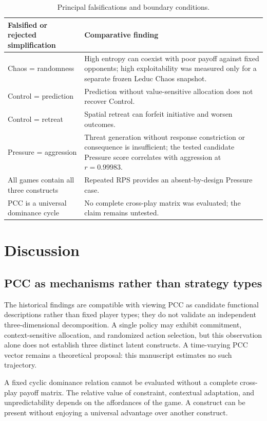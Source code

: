 \documentclass[journal]{IEEEtran}
\begin{document}
\begin{table}[t]
\caption{Principal falsifications and boundary conditions.}
\label{tab:falsifications}
\centering
\begin{tabular}{L{5.5cm}L{9.5cm}}
\toprule
\textbf{Falsified or rejected simplification} & \textbf{Comparative finding} \\
\midrule
Chaos = randomness & High entropy can coexist with poor payoff against fixed opponents; high exploitability was measured only for a separate frozen Leduc Chaos snapshot. \\
Control = prediction & Prediction without value-sensitive allocation does not recover Control. \\
Control = retreat & Spatial retreat can forfeit initiative and worsen outcomes. \\
Pressure = aggression & Threat generation without response constriction or consequence is insufficient; the tested candidate Pressure score correlates with aggression at $r=0.99983$. \\
All games contain all three constructs & Repeated RPS provides an absent-by-design Pressure case. \\
PCC is a universal dominance cycle & No complete cross-play matrix was evaluated; the claim remains untested. \\
\bottomrule
\end{tabular}
\end{table}

\section{Discussion}

\subsection{PCC as mechanisms rather than strategy types}

The historical findings are compatible with viewing PCC as candidate functional descriptions rather than fixed player types; they do not validate an independent three-dimensional decomposition. A single policy may exhibit commitment, context-sensitive allocation, and randomized action selection, but this observation alone does not establish three distinct latent constructs. A time-varying PCC vector remains a theoretical proposal: this manuscript estimates no such trajectory.

A fixed cyclic dominance relation cannot be evaluated without a complete cross-play payoff matrix. The relative value of constraint, contextual adaptation, and unpredictability depends on the affordances of the game. A construct can be present without enjoying a universal advantage over another construct.
\end{document}
